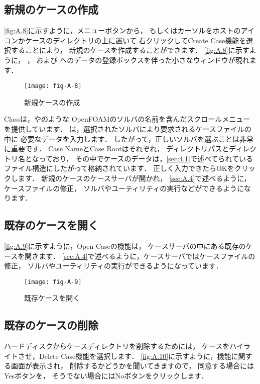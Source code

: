 \subsection{新規のケースの作成}
\label{ssec:A.3.2}
\autoref{fig:A.8}に示すように，メニューボタンから，
もしくはカーソルをホストのアイコンかケースのディレクトリの上に置いて
右クリックしてCreate Case機能を選択することにより，
新規のケースを作成することができます．
\autoref{fig:A.8}に示すように，
%
%
，
%
%
および
%
%
へのデータの登録ボックスを伴った小さなウィンドウが現れます．


\begin{figure}[ht]
 \texttt{[image: fig-A-8]}
 \caption{新規ケースの作成}
 \label{fig:A.8}
\end{figure}


Classは，やのような
OpenFOAMのソルバの名前を含んだスクロールメニューを提供しています．
は，選択されたソルバにより要求されるケースファイルの中に
必要なデータを入力します．
したがって，正しいソルバを選ぶことは非常に重要です．
Case NameとCase Rootはそれぞれ，
ディレクトリパスとディレクトリ名となっており，
その中でケースのデータは，\autoref{sec:4.1}で述べてられている
ファイル構造にしたがって格納されています．
正しく入力できたらOKをクリックします．
新規のケースのケースサーバが開かれ，
\autoref{sec:A.4}で述べるように，ケースファイルの修正，
ソルバやユーティリティの実行などができるようになります．


\subsection{既存のケースを開く}
\label{ssec:A.3.3}
\autoref{fig:A.9}に示すように，Open Caseの機能は，
ケースサーバの中にある既存のケースを開きます．
\autoref{sec:A.4}で述べるように，ケースサーバではケースファイルの修正，
ソルバやユーティリティの実行ができるようになっています．


\begin{figure}[ht]
 \texttt{[image: fig-A-9]}
 \caption{既存ケースを開く}
 \label{fig:A.9}
\end{figure}


\subsection{既存のケースの削除}
\label{ssec:A.3.4}
ハードディスクからケースディレクトリを削除するためには，
ケースをハイライトさせ，Delete Case機能を選択します．
\autoref{fig:A.10}に示すように，機能に関する画面が表示され，
削除するかどうかを聞いてきますので，
同意する場合にはYesボタンを，
そうでない場合にはNoボタンをクリックします．


